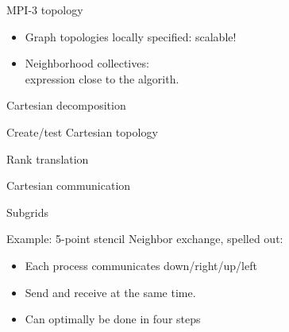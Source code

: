 \begin{numberedframe}{MPI-3 topology}
  \begin{itemize}
  \item Graph topologies locally specified: scalable!
  \item Neighborhood collectives:\\
    expression close to the algorith.
  \end{itemize}
\end{numberedframe}


\begin{numberedframe}{Cartesian decomposition}
\end{numberedframe}

\begin{numberedframe}{Create/test Cartesian topology}
\end{numberedframe}

\begin{numberedframe}{Rank translation}
\end{numberedframe}

\begin{numberedframe}{Cartesian communication}
\end{numberedframe}

\begin{numberedframe}{Subgrids}
\end{numberedframe}


\begin{numberedframe}{Example: 5-point stencil}
  Neighbor exchange,
  spelled out:
  \begin{itemize}
  \item Each process communicates down/right/up/left
  \item Send and receive at the same time.
  \item Can optimally be done in four steps
  \end{itemize}
\end{numberedframe}

